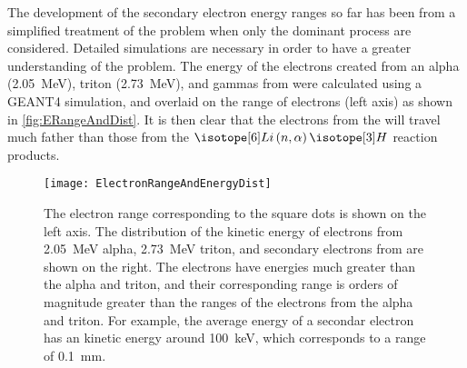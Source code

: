 The development of the secondary electron energy ranges so far has been from a simplified treatment of the problem when only the dominant process are considered.
Detailed simulations are necessary in order to have a greater understanding of the problem. 
The energy of the electrons created from an alpha (\SI{2.05}{\MeV}), triton (\SI{2.73}{\MeV}), and gammas from  were calculated using a GEANT4 simulation, and overlaid on the range of electrons (left axis) as shown in \autoref{fig:ERangeAndDist}.
It is then clear that the electrons from the  will travel much father than those from the $\iso[6]{Li}\left(n,\alpha\right)\iso[3]{H}$ reaction products.
\begin{figure}
  \centering
  \texttt{[image: ElectronRangeAndEnergyDist]}
  \caption[Electron Range and Energy Distribution of Selected Reactions]{The electron range corresponding to the square dots is shown on the left axis. The distribution of the kinetic energy of electrons from \SI{2.05}{\MeV} alpha, \SI{2.73}{\MeV} triton, and secondary electrons from  are shown on the right. The  electrons have energies much greater than the alpha and triton, and their corresponding range is orders of magnitude greater than the ranges of the electrons from the alpha and triton. For example, the average energy of a secondar electron has an kinetic energy around \SI{100}{\keV}, which corresponds to a range of \SI{0.1}{\mm}. \rangeSimGeo}
  \label{fig:ERangeAndDist}
\end{figure}
